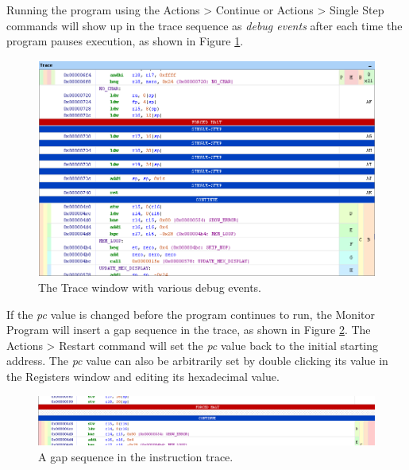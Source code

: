 \documentclass[11pt, twoside, pdftex]{article}
\begin{document}
Running the program using the \textsf{Actions > Continue} or
\textsf{Actions > Single Step} commands will show up in the
trace sequence as {\it debug events} after each time the
program pauses execution, as shown in 
Figure \ref{fig:AMP_trace_debugevents}.

\begin{figure}[H]
   \begin{center}
      \includegraphics[scale=1]{screenshots/figure64.png}
   \end{center}
   \caption{The Trace window with various debug events.}
   \label{fig:AMP_trace_debugevents}
\end{figure}

If the {\it pc} value is changed before the program continues 
to run, the Monitor Program will insert a gap sequence in the
trace, as shown in Figure \ref{fig:AMP_trace_gap}. 
The \textsf{Actions > Restart} command will set the {\it pc}
value back to the initial starting address. The {\it pc} 
value can also be arbitrarily set by double clicking its value 
in the \textsf{Registers} window and editing
its hexadecimal value. 

\begin{figure}[H]
   \begin{center}
      \includegraphics[scale=1]{screenshots/figure65.png}
   \end{center}
   \caption{A gap sequence in the instruction trace.}
   \label{fig:AMP_trace_gap}
\end{figure}
\end{document}
